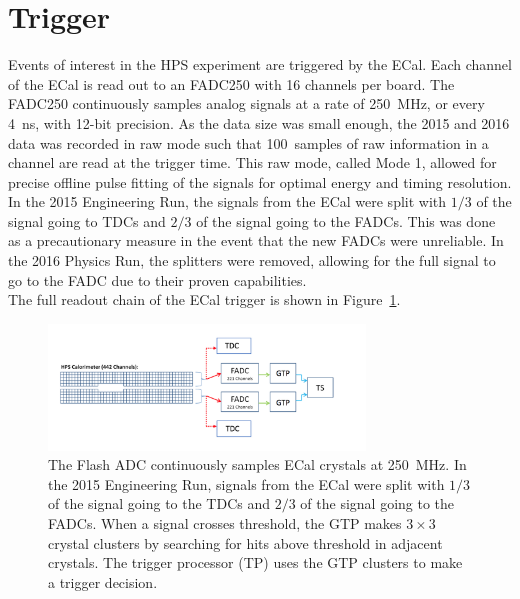 \section{Trigger}
Events of interest in the HPS experiment are triggered by the ECal. Each channel of the ECal is read out to an FADC250 with 16 channels per board. The FADC250 continuously samples analog signals at a rate of 250~MHz, or every 4~ns, with 12-bit precision. As the data size was small enough, the 2015 and 2016 data was recorded in raw mode such that 100~samples of raw information in a channel are read at the trigger time. This raw mode, called Mode 1, allowed for precise offline pulse fitting of the signals for optimal energy and timing resolution. In the 2015 Engineering Run, the signals from the ECal were split with $1/3$ of the signal going to TDCs and $2/3$ of the signal going to the FADCs. This was done as a precautionary measure in the event that the new FADCs were unreliable. In the 2016 Physics Run, the splitters were removed, allowing for the full signal to go to the FADC due to their proven capabilities. \\
\indent The full readout chain of the ECal trigger is shown in Figure~\ref{Figure:readoutChain}.
\begin{figure}[thb]
  \centering
      \includegraphics[width=0.75\textwidth]{pics/experiment/readoutChain.png}
  \caption[ECal readout chain]{The Flash ADC continuously samples ECal crystals at 250~MHz. In the 2015 Engineering Run, signals from the ECal were split with $1/3$ of the signal going to the TDCs and $2/3$ of the signal going to the FADCs. When a signal crosses threshold, the GTP makes $3\times3$ crystal clusters by searching for hits above threshold in adjacent crystals. The trigger processor (TP) uses the GTP clusters to make a trigger decision.}
  \label{Figure:readoutChain}
\end{figure}

